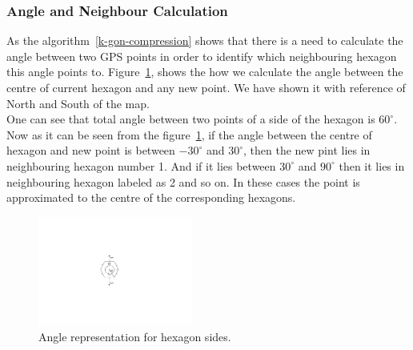\documentclass[conference]{IEEEtran}
\begin{document}
\subsubsection{Angle and Neighbour Calculation}
As the algorithm~\ref{k-gon-compression} shows that there is a need to calculate the angle between two GPS points in order to identify which neighbouring hexagon this angle points to. Figure~\ref{fig:angle-calculation}, shows the how we calculate the angle between the centre of current hexagon and any new point. We have shown it with reference of North and South of the map.\\
One can see that total angle between two points of a side of the hexagon is ${60}^{\circ}$. Now as it can be seen from the figure~\ref{fig:angle-calculation}, if the angle between the centre of hexagon and new point is between ${-30}^{\circ}$ and ${30}^{\circ}$, then the new pint lies in neighbouring hexagon number 1. And if it lies between ${30}^{\circ}$ and ${90}^{\circ}$ then it lies in neighbouring hexagon labeled as 2 and so on. In these cases the point is approximated to the centre of the corresponding hexagons.

\begin{figure}[ht]
\centering
  \includegraphics[width=2in]{images/angle-calculation.pdf}
  \caption {Angle representation for hexagon sides.}\label{fig:angle-calculation}
\end{figure}
\end{document}
